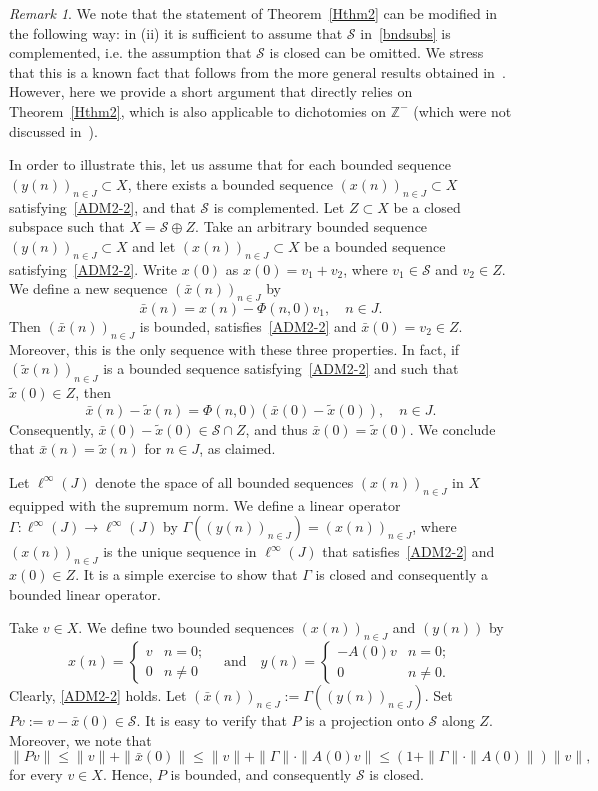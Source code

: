 \documentclass[11pt,reqno,a4paper]{amsart}
\theoremstyle{plain}
\numberwithin{equation}{section}
\theoremstyle{remark}
\newtheorem{remark}{Remark}
\def\Z{\mathbb{Z}}
\begin{document}
\begin{remark}\label{120rem}
We note that the statement of Theorem~\ref{Hthm2} can be modified in the following way: in (ii) it is sufficient to assume that $\mathcal S$  in~\eqref{bndsubs} is complemented, i.e. the assumption that $\mathcal S$ is closed can be omitted.  We stress that this is a known fact that follows from the more general results obtained in~\cite{BDV}. However, here we provide a short argument that directly relies on Theorem~\ref{Hthm2}, which is also applicable to dichotomies on $\Z^-$ (which were not discussed in~\cite{BDV}). 

In order to illustrate this, let us assume that for each bounded sequence $(y(n))_{n\in J}\subset X$, there exists a bounded sequence $(x(n))_{n\in J} \subset X$ satisfying~\eqref{ADM2-2}, and that $\mathcal S$ is complemented. Let $Z\subset X$ be a closed subspace such that $X=\mathcal S\oplus Z$. Take an arbitrary bounded sequence 
$(y(n))_{n\in J}\subset X$ and let $(x(n))_{n\in J} \subset X$ be a bounded sequence satisfying~\eqref{ADM2-2}. Write $x(0)$ as $x(0)=v_1+v_2$, where $v_1\in \mathcal S$ and $v_2\in Z$. We define a new sequence $(\bar x(n))_{n\in J}$ by \[ \bar x(n)=x(n)-\Phi(n, 0)v_1, \quad n\in J. \] Then $(\bar x(n))_{n\in J}$ is bounded, satisfies~\eqref{ADM2-2} and $\bar x(0)=v_2\in Z$. Moreover, this is the only sequence with these three properties. In fact, if $(\tilde x(n))_{n\in J}$ is a bounded sequence satisfying~\eqref{ADM2-2} and such that $\tilde x(0)\in Z$, then
\[
\bar x(n)-\tilde x(n)=\Phi(n, 0)(\bar x(0)-\tilde x(0)), \quad n\in J.
\]
Consequently, $\bar x(0)-\tilde x(0)\in \mathcal S\cap Z$, and thus $\bar x(0)=\tilde x(0)$. We conclude that $\bar x(n)=\tilde x(n)$ for $n\in J$, as claimed.


Let $\ell^\infty(J)$ denote the space of all bounded sequences $(x(n))_{n\in J}$ in $X$ equipped with the supremum norm. We define a linear operator $\Gamma \colon \ell^\infty(J)\to \ell^\infty(J)$ by $\Gamma ((y(n))_{n\in J})=(x(n))_{n\in J}$, where $(x(n))_{n\in J}$ is the unique sequence in $\ell^\infty(J)$ that satisfies~\eqref{ADM2-2} and $x(0)\in Z$. It is a simple exercise to show that $\Gamma$ is closed and consequently a bounded linear operator. 

Take $v\in X$. We define two bounded sequences $(x(n))_{n\in J}$ and $(y(n))$ by 
\[
x(n)=\begin{cases}
    v & n=0; \\
    0 & n\neq 0
\end{cases} \quad \text{and} \quad 
y(n)=\begin{cases}
-A(0)v &n=0; \\
0 &  n\neq 0.
\end{cases}
\]
Clearly, \eqref{ADM2-2} holds. Let $(\bar x(n))_{n\in J}:=\Gamma ((y(n))_{n\in J})$. Set $Pv:=v-\bar x(0)\in \mathcal S$. It is easy to verify that $P$ is a  projection onto $\mathcal S$ along $Z$. Moreover, we note that 
\[
\|Pv\| \le \|v\|+\|\bar x(0)\|\le \|v\|+\|\Gamma\| \cdot \|A(0)v\| \le (1+\|\Gamma\| \cdot \|A(0)\|)\|v\|, 
\]
for every $v\in X$. Hence, $P$ is bounded, and consequently $\mathcal S$ is closed.
\end{remark}
\end{document}
